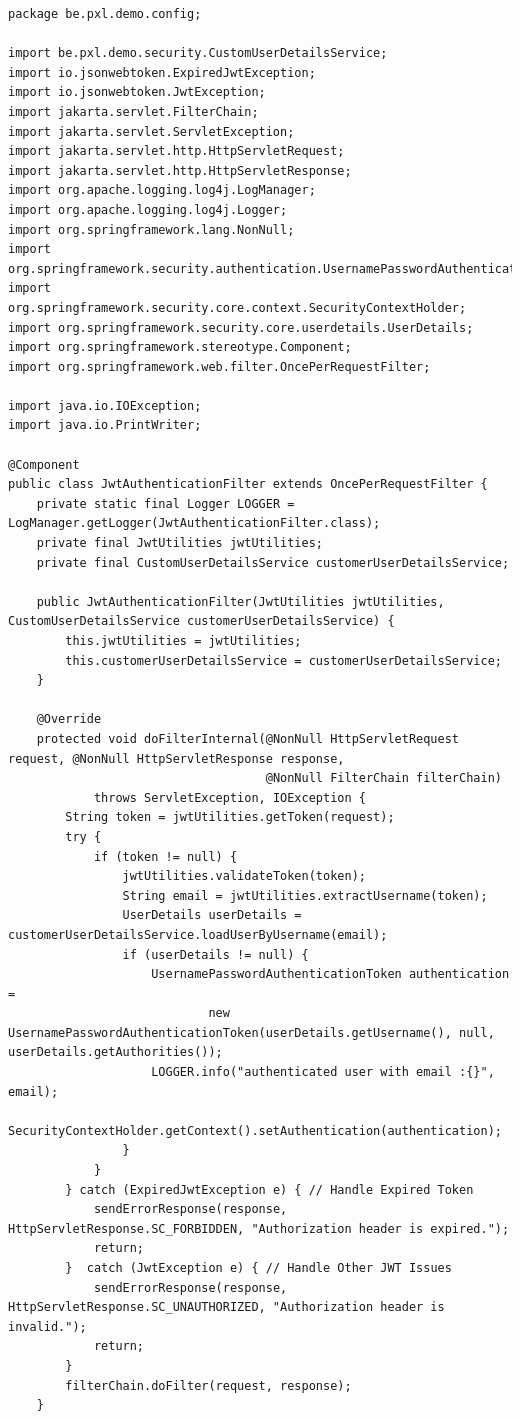 \begin{lstlisting}
package be.pxl.demo.config;

import be.pxl.demo.security.CustomUserDetailsService;
import io.jsonwebtoken.ExpiredJwtException;
import io.jsonwebtoken.JwtException;
import jakarta.servlet.FilterChain;
import jakarta.servlet.ServletException;
import jakarta.servlet.http.HttpServletRequest;
import jakarta.servlet.http.HttpServletResponse;
import org.apache.logging.log4j.LogManager;
import org.apache.logging.log4j.Logger;
import org.springframework.lang.NonNull;
import org.springframework.security.authentication.UsernamePasswordAuthenticationToken;
import org.springframework.security.core.context.SecurityContextHolder;
import org.springframework.security.core.userdetails.UserDetails;
import org.springframework.stereotype.Component;
import org.springframework.web.filter.OncePerRequestFilter;

import java.io.IOException;
import java.io.PrintWriter;

@Component
public class JwtAuthenticationFilter extends OncePerRequestFilter {
    private static final Logger LOGGER = LogManager.getLogger(JwtAuthenticationFilter.class);
    private final JwtUtilities jwtUtilities;
    private final CustomUserDetailsService customerUserDetailsService;

    public JwtAuthenticationFilter(JwtUtilities jwtUtilities, CustomUserDetailsService customerUserDetailsService) {
        this.jwtUtilities = jwtUtilities;
        this.customerUserDetailsService = customerUserDetailsService;
    }

    @Override
    protected void doFilterInternal(@NonNull HttpServletRequest request, @NonNull HttpServletResponse response,
                                    @NonNull FilterChain filterChain)
            throws ServletException, IOException {
        String token = jwtUtilities.getToken(request);
        try {
            if (token != null) {
                jwtUtilities.validateToken(token);
                String email = jwtUtilities.extractUsername(token);
                UserDetails userDetails = customerUserDetailsService.loadUserByUsername(email);
                if (userDetails != null) {
                    UsernamePasswordAuthenticationToken authentication =
                            new UsernamePasswordAuthenticationToken(userDetails.getUsername(), null, userDetails.getAuthorities());
                    LOGGER.info("authenticated user with email :{}", email);
                    SecurityContextHolder.getContext().setAuthentication(authentication);
                }
            }
        } catch (ExpiredJwtException e) { // Handle Expired Token
            sendErrorResponse(response, HttpServletResponse.SC_FORBIDDEN, "Authorization header is expired.");
            return;
        }  catch (JwtException e) { // Handle Other JWT Issues
            sendErrorResponse(response, HttpServletResponse.SC_UNAUTHORIZED, "Authorization header is invalid.");
            return;
        }
        filterChain.doFilter(request, response);
    }


\end{lstlisting}
